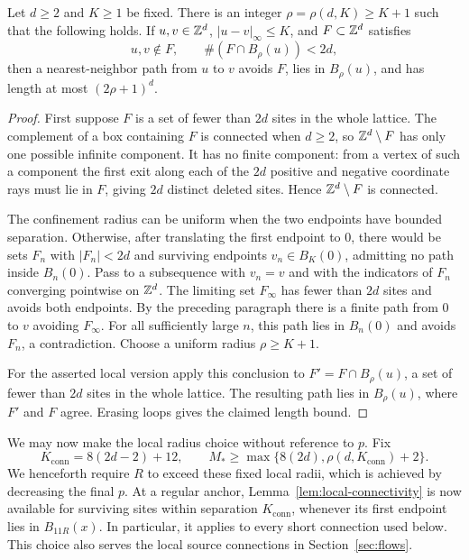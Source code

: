 \begin{lemma}\label{lem:local-connectivity}
Let \(d\ge2\) and \(K\ge1\) be fixed.  There is an integer
\(\rho=\rho(d,K)\ge K+1\) such that the following holds.
If \(u,v\in\mathbb Z^d\), \(|u-v|_\infty\le K\), and
\(F\subset\mathbb Z^d\) satisfies
\[
 u,v\notin F,\qquad \#(F\cap B_\rho(u))<2d,
\]
then a nearest-neighbor path from \(u\) to \(v\) avoids \(F\),
lies in \(B_\rho(u)\), and has length at most \((2\rho+1)^d\).
\end{lemma}

\begin{proof}
First suppose \(F\) is a set of fewer than \(2d\) sites in the
whole lattice.  The complement of a box containing \(F\) is connected
when \(d\ge2\), so \(\mathbb Z^d\setminus F\) has only one possible
infinite component.  It has no finite component: from a vertex of
such a component the first exit along each of the \(2d\) positive
and negative coordinate rays must lie in \(F\), giving \(2d\)
distinct deleted sites.  Hence \(\mathbb Z^d\setminus F\) is connected.

The confinement radius can be uniform when the two endpoints have
bounded separation.  Otherwise, after translating the first endpoint
to \(0\), there would be sets \(F_n\) with \(|F_n|<2d\) and
surviving endpoints \(v_n\in B_K(0)\), admitting no path inside
\(B_n(0)\).  Pass to a subsequence with \(v_n=v\) and with the
indicators of \(F_n\) converging pointwise on \(\mathbb Z^d\).  The limiting
set \(F_\infty\) has fewer than \(2d\) sites and avoids both
endpoints.  By the preceding paragraph there is a finite path from
\(0\) to \(v\) avoiding \(F_\infty\).  For all sufficiently large
\(n\), this path lies in \(B_n(0)\) and avoids \(F_n\), a
contradiction.  Choose a uniform radius \(\rho\ge K+1\).

For the asserted local version apply this conclusion to
\(F'=F\cap B_\rho(u)\), a set of fewer than \(2d\) sites in the
whole lattice.  The resulting path lies in \(B_\rho(u)\), where
\(F'\) and \(F\) agree.  Erasing loops gives the claimed length bound.
\end{proof}

We may now make the local radius choice without reference to \(p\).
Fix
\begin{equation}\label{eq:local-radius-choice}
 K_{\mathrm{conn}}=8(2d-2)+12,\qquad
 M_*\ge\max\{8(2d),\rho(d,K_{\mathrm{conn}})+2\}.
\end{equation}
We henceforth require \(R\) to exceed these fixed local radii, which
is achieved by decreasing the final \(p\).  At a regular anchor,
Lemma~\ref{lem:local-connectivity} is now available for surviving
sites within separation \(K_{\mathrm{conn}}\), whenever its first
endpoint lies in \(B_{11R}(x)\).  In particular, it applies to every
short connection used below.  This choice also serves the local
source connections in Section~\ref{sec:flows}.

